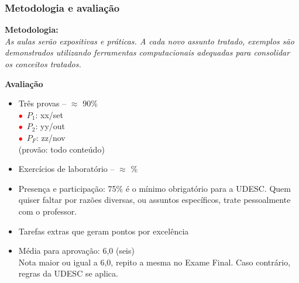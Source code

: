 \begin{frame}[allowframebreaks=0.9]

\frametitle{Metodologia e avaliação}

\textbf{Metodologia:} \\

\textit{As aulas serão expositivas e práticas. A cada novo assunto tratado, exemplos  são demonstrados utilizando ferramentas computacionais adequadas para consolidar os conceitos 
 tratados. 
 }


\newpage
    \textbf{Avaliação}

    \begin{itemize}
    \item Três provas -- $\approx$  90\%\\
      
	\quad \textcolor{red}{$\bullet$}~$P_1$: xx/set\\
	\quad \textcolor{red}{$\bullet$}~$P_2$: yy/out\\
	\quad \textcolor{red}{$\bullet$}~$P_F$: zz/nov\\(provão: todo conteúdo)

      \item Exercícios de laboratório  -- $\approx$ \%
       
      \item Presença e participação: 75\% é o mínimo obrigatório
      para a UDESC. Quem quiser faltar por razões diversas,
       ou assuntos específicos, trate pessoalmente com o professor.
        
      \item Tarefas extras que geram pontos por excelência 
      
      \item Média para aprovação: 6,0 (seis)\\
      Nota maior ou igual a 6,0, repito a mesma no Exame Final. Caso contrário, regras da UDESC se aplica.
      
    \end{itemize}

\end{frame}




